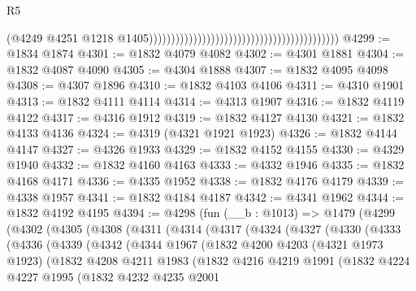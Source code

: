 \begin{lexlean}{R5}
\begin{coremodule}
                                                                                        (@4249
                                                                                          @4251
                                                                                          @1218
                                                                                          @1405)))))))))))))))))))))))))))))))))))))))))))
@4299 := @1834 @1874
@4301 := @1832 @4079 @4082
@4302 := @4301 @1881
@4304 := @1832 @4087 @4090
@4305 := @4304 @1888
@4307 := @1832 @4095 @4098
@4308 := @4307 @1896
@4310 := @1832 @4103 @4106
@4311 := @4310 @1901
@4313 := @1832 @4111 @4114
@4314 := @4313 @1907
@4316 := @1832 @4119 @4122
@4317 := @4316 @1912
@4319 := @1832 @4127 @4130
@4321 := @1832 @4133 @4136
@4324 := @4319 (@4321 @1921 @1923)
@4326 := @1832 @4144 @4147
@4327 := @4326 @1933
@4329 := @1832 @4152 @4155
@4330 := @4329 @1940
@4332 := @1832 @4160 @4163
@4333 := @4332 @1946
@4335 := @1832 @4168 @4171
@4336 := @4335 @1952
@4338 := @1832 @4176 @4179
@4339 := @4338 @1957
@4341 := @1832 @4184 @4187
@4342 := @4341 @1962
@4344 := @1832 @4192 @4195
@4394 := @4298
    (fun (__b : @1013) =>
    @1479
      (@4299
        (@4302
          (@4305
            (@4308
              (@4311
                (@4314
                  (@4317
                    (@4324
                      (@4327
                        (@4330
                          (@4333
                            (@4336
                              (@4339
                                (@4342
                                  (@4344
                                    @1967
                                    (@1832
                                      @4200
                                      @4203
                                      (@4321 @1973 @1923)
                                      (@1832
                                        @4208
                                        @4211
                                        @1983
                                        (@1832
                                          @4216
                                          @4219
                                          @1991
                                          (@1832
                                            @4224
                                            @4227
                                            @1995
                                            (@1832
                                              @4232
                                              @4235
                                              @2001

\end{coremodule}
\end{lexlean}
